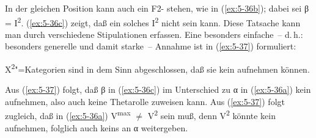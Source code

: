 \documentclass[output=paper]{LSP/langsci}
\begin{document}
\begin{exe}
\ex%
\label{ex:5-36}
\begin{xlist}
\end{xlist}
\end{exe}
In der gleichen Position kann auch ein F2- stehen, wie in
(\ref{ex:5-36b}); dabei sei β = I\textsuperscript{2}. (\ref{ex:5-36c}) zeigt, daß
ein solches I\textsuperscript{2} nicht  sein kann. Diese
Tatsache kann man durch verschiedene Stipulationen erfassen. Eine
besonders einfache~-- d.\,h.: besonders generelle und damit starke~-- Annahme ist in (\ref{ex:5-37}) formuliert:
\begin{exe}
\ex%
\label{ex:5-37}
X\textsuperscript{2}{}"=Kategorien sind in dem Sinn abgeschlossen, daß sie kein  aufnehmen können.
\end{exe}
Aus (\ref{ex:5-37}) folgt, daß β in (\ref{ex:5-36c}) im Unterschied zu α in (\ref{ex:5-36a}) kein  aufnehmen, also auch keine Thetarolle zuweisen kann. Aus (\ref{ex:5-37}) folgt zugleich, daß in (\ref{ex:5-36a}) V\textsuperscript{max} ${\neq}$ V\textsuperscript{2} sein muß, denn V\textsuperscript{2} könnte kein  aufnehmen, folglich auch keins an α weitergeben.

\printbibliography[heading=subbibliography,notkeyword=this]
\label{chap-projektionsstufen-end}
\end{document}
